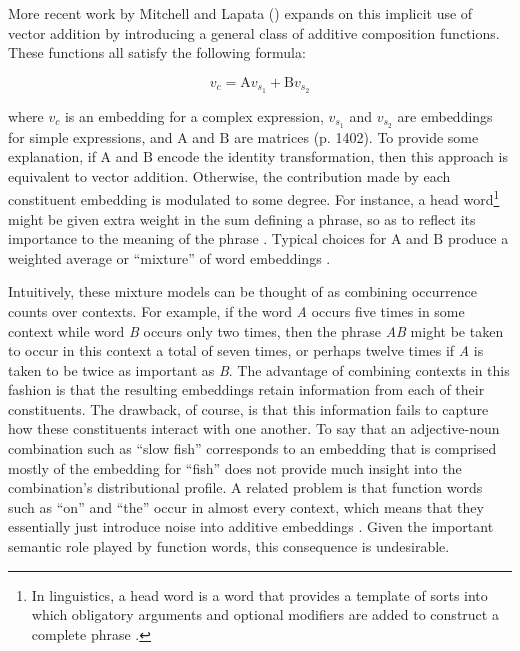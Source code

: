 More recent work by Mitchell and Lapata (\citeyear{Mitchell:2010}) expands on this implicit use of vector addition by introducing a general class of additive composition functions. These functions all satisfy the following formula: 

\begin{equation}
v_{c} = \textrm{A}v_{s_1}+ \textrm{B}v_{s_2} 
\end{equation}

\noindent 
where $ v_{c} $ is an embedding for a complex expression, $ v_{s_1} $ and $ v_{s_2} $ are embeddings for simple expressions, and $ \textrm{A} $ and $ \textrm{B} $ are matrices (p. 1402). To provide some explanation, if $ \textrm{A} $ and $ \textrm{B} $ encode the identity transformation, then this approach is equivalent to vector addition. Otherwise, the contribution made by each constituent embedding is modulated to some degree. For instance, a head word\footnote{In linguistics, a head word is a word that provides a template of sorts into which obligatory arguments and optional modifiers are added to construct a complete phrase \citep{Pinker:1994,Harley:2014}.} might be given extra weight in the sum defining a phrase, so as to reflect its importance to the meaning of the phrase \citep{Baroni:2014}. Typical choices for $ \textrm{A} $ and $ \textrm{B} $ produce a weighted average or ``mixture'' of word embeddings \citep{Baroni:2014}.

Intuitively, these mixture models can be thought of as combining occurrence counts over contexts. For example, if the word \textit{A} occurs five times in some context while word \textit{B} occurs only two times, then the phrase \textit{AB} might be taken to occur in this context a total of seven times, or perhaps twelve times if \textit{A} is taken to be twice as important as \textit{B}. The advantage of combining contexts in this fashion is that the resulting embeddings retain information from each of their constituents. The drawback, of course, is that this information fails to capture how these constituents interact with one another. To say that an adjective-noun combination such as ``slow fish'' corresponds to an embedding that is comprised mostly of the embedding for ``fish'' does not provide much insight into the combination's distributional profile. A related problem is that function words such as ``on'' and ``the'' occur in almost every context, which means that they essentially just introduce noise into additive embeddings \citep{Baroni:2014}. Given the important semantic role played by function words, this consequence is undesirable. 

